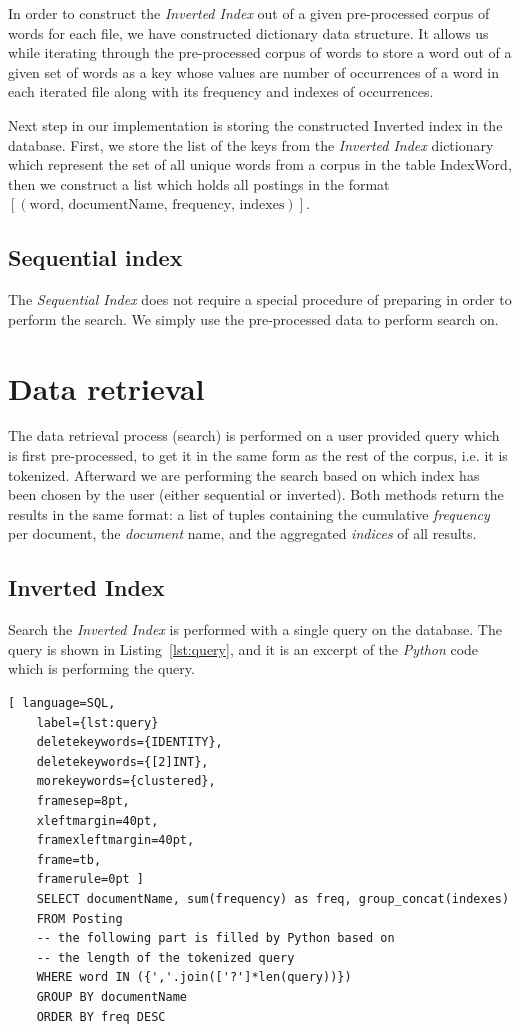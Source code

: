 \documentclass{article}
\begin{document}
	In order to construct the \textit{Inverted Index} out of a given pre-processed corpus of words for each file, we have constructed dictionary data structure. It allows us while iterating through the pre-processed corpus of words to store a word out of a given set of words as a key whose values are number of occurrences of a word in each iterated file along with its frequency and indexes of occurrences.
	
	Next step in our implementation is storing the constructed Inverted index in the database. First, we store the list of the keys from the \textit{Inverted Index} dictionary which represent the set of all unique words from a corpus in the table IndexWord, then we construct a list which holds all postings in the format \newline \texttt{$[(\mbox{word, documentName, frequency, indexes})]$}.
	
	
	\subsection{Sequential index}
	
	The \textit{Sequential Index} does not require a special procedure of preparing in order to perform the search. We simply use the pre-processed data to perform search on.
	
	\section{Data retrieval}
	The data retrieval process (search) is performed on a user provided query which is first pre-processed, to get it in the same form as the rest of the corpus, i.e. it is tokenized. Afterward we are performing the search based on which index has been chosen by the user (either sequential or inverted). Both methods return the results in the same format: a list of tuples containing the cumulative \textit{frequency} per document, the \textit{document} name, and the aggregated \textit{indices} of all results.
	
	\subsection{Inverted Index}
	Search the \textit{Inverted Index} is performed with a single query on the database. The query is shown in Listing~\ref{lst:query}, and it is an excerpt of the \textit{Python} code which is performing the query.
	
	\begin{lstlisting}[ language=SQL,
	label={lst:query}
	deletekeywords={IDENTITY},
	deletekeywords={[2]INT},
	morekeywords={clustered},
	framesep=8pt,
	xleftmargin=40pt,
	framexleftmargin=40pt,
	frame=tb,
	framerule=0pt ]
	SELECT documentName, sum(frequency) as freq, group_concat(indexes)
	FROM Posting
	-- the following part is filled by Python based on
	-- the length of the tokenized query
	WHERE word IN ({','.join(['?']*len(query))})
	GROUP BY documentName
	ORDER BY freq DESC
	\end{lstlisting}
	
\end{document}

